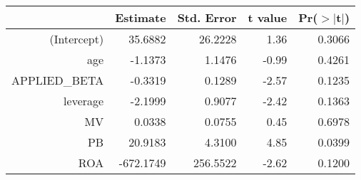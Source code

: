 \begin{table}[ht]
\centering
\begin{tabular}{rrrrr}
  \hline
 & Estimate & Std. Error & t value & Pr($>$$|$t$|$) \\ 
  \hline
(Intercept) & 35.6882 & 26.2228 & 1.36 & 0.3066 \\ 
  age & -1.1373 & 1.1476 & -0.99 & 0.4261 \\ 
  APPLIED\_BETA & -0.3319 & 0.1289 & -2.57 & 0.1235 \\ 
  leverage & -2.1999 & 0.9077 & -2.42 & 0.1363 \\ 
  MV & 0.0338 & 0.0755 & 0.45 & 0.6978 \\ 
  PB & 20.9183 & 4.3100 & 4.85 & 0.0399 \\ 
  ROA & -672.1749 & 256.5522 & -2.62 & 0.1200 \\ 
   \hline
\end{tabular}
\end{table}
